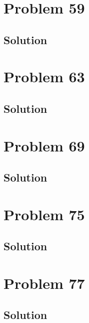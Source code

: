 \documentclass[12pt]{article}
\begin{document}
    \pagebreak
    \section{Problem 59}

        \subsection{Solution}

    \pagebreak
    \section{Problem 63}

        \subsection{Solution}

    \pagebreak
    \section{Problem 69}

        \subsection{Solution}

    \pagebreak
    \section{Problem 75}

        \subsection{Solution}

    \pagebreak
    \section{Problem 77}

        \subsection{Solution}

    \pagebreak
    
    \tableofcontents
\end{document}
